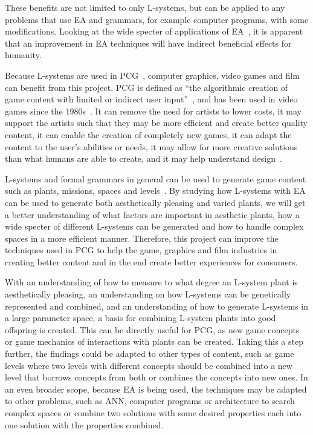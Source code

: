 These benefits are not limited to only \glspl{L-system}, but can be applied to any problems that use \gls{EA} and grammars, for example computer programs, with some modifications.
Looking at the wide specter of applications of \gls{EA}~\cite{2006AshlockEA}, it is apparent that an improvement in \gls{EA} techniques will have indirect beneficial effects for humanity.

Because \glspl{L-system} are used in \gls{PCG}~\cite{PCG_5}, computer graphics, video games and film can benefit from this project.
\Gls{PCG} is defined as ``the algorithmic creation of game content with limited or indirect user input''~\cite{2011Togelius}, and has been used in video games since the 1980s~\cite{PCG_1}.
It can remove the need for artists to lower costs, it may support the artists such that they may be more efficient and create better quality content, it can enable the creation of completely new games, it can adapt the content to the user's abilities or needs, it may allow for more creative solutions than what humans are able to create, and it may help understand design~\cite{PCG_1}.

\Glspl{L-system} and formal grammars in general can be used to generate game content such as plants, missions, spaces and levels~\cite{PCG_5}.
By studying how \glspl{L-system} with \gls{EA} can be used to generate both aesthetically pleasing and varied plants, we will get a better understanding of what factors are important in aesthetic plants, how a wide specter of different L-systems can be generated and how to handle complex spaces in a more efficient manner.
Therefore, this project can improve the techniques used in \gls{PCG} to help the game, graphics and film industries in creating better content and in the end create better experiences for consumers.

With an understanding of how to measure to what degree an L-system plant is aesthetically pleasing, an understanding on how L-systems can be genetically represented and combined, and an understanding of how to generate L-systems in a large parameter space, a basis for combining L-system plants into good offspring is created.
This can be directly useful for \gls{PCG}, as new game concepts or game mechanics of interactions with plants can be created.
Taking this a step further, the findings could be adapted to other types of content, such as game levels where two levels with different concepts should be combined into a new level that borrows concepts from both or combines the concepts into new ones.
In an even broader scope, because \gls{EA} is being used, the techniques may be adapted to other problems, such as \gls{ANN}, computer programs or architecture to search complex spaces or combine two solutions with some desired properties each into one solution with the properties combined.

